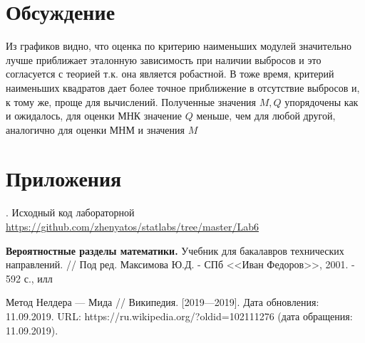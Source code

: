 \documentclass[12pt,a4paper]{article}
\begin{document}
\section{Обсуждение}
Из графиков видно, что оценка по критерию наименьших модулей значительно лучше приближает эталонную зависимость при наличии выбросов и это согласуется с теорией т.к. она является робастной. В тоже время, критерий наименьших квадратов дает более точное приближение в отсутствие выбросов и, к тому же, проще для вычислений. Полученные значения $M, Q$ упорядочены как и ожидалось, для оценки МНК значение $Q$ меньше, чем для любой другой, аналогично для оценки МНМ и значения $M$ 
\pagebreak

\section{Приложения}
. Исходный код лабораторной {\url{https://github.com/zhenyatos/statlabs/tree/master/Lab6}}

\begin{thebibliography}{9} 
	 \textbf{Вероятностные разделы математики.} Учебник для бакалавров технических направлений. // Под ред. Максимова Ю.Д. - СПб <<Иван Федоров>>, 2001. - 592 с., илл
	
	 Метод Нелдера — Мида // Википедия. [2019—2019]. Дата обновления: 11.09.2019. URL: https://ru.wikipedia.org/?oldid=102111276 (дата обращения: 11.09.2019).
\end{thebibliography}
\end{document}
